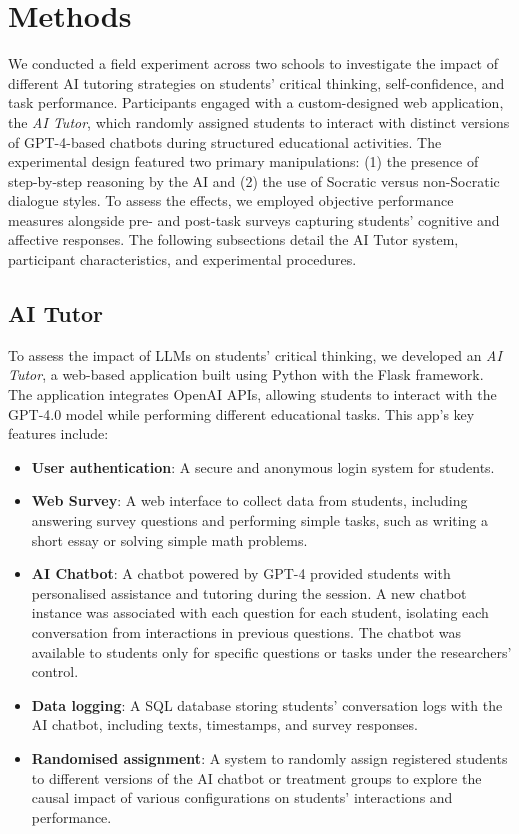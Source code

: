 \documentclass[
  12pt,
]{article}
\providecommand{\tightlist}{%
  \setlength{\itemsep}{0pt}\setlength{\parskip}{0pt}}
\begin{document}
\section{Methods}\label{sec:methods}

We conducted a field experiment across two schools to investigate the impact of different AI tutoring strategies on students' critical thinking, self-confidence, and task performance. Participants engaged with a custom-designed web application, the \emph{AI Tutor}, which randomly assigned students to interact with distinct versions of GPT-4-based chatbots during structured educational activities. The experimental design featured two primary manipulations: (1) the presence of step-by-step reasoning by the AI and (2) the use of Socratic versus non-Socratic dialogue styles. To assess the effects, we employed objective performance measures alongside pre- and post-task surveys capturing students' cognitive and affective responses. The following subsections detail the AI Tutor system, participant characteristics, and experimental procedures.

\subsection{AI Tutor}\label{ai-tutor}

To assess the impact of LLMs on students' critical thinking, we developed an \emph{AI Tutor}, a web-based application built using Python with the Flask framework. The application integrates OpenAI APIs, allowing students to interact with the GPT-4.0 model while performing different educational tasks. This app's key features include:

\begin{itemize}
\tightlist
\item
  \textbf{User authentication}: A secure and anonymous login system for students.
\item
  \textbf{Web Survey}: A web interface to collect data from students, including answering survey questions and performing simple tasks, such as writing a short essay or solving simple math problems.
\item
  \textbf{AI Chatbot}: A chatbot powered by GPT-4 provided students with personalised assistance and tutoring during the session. A new chatbot instance was associated with each question for each student, isolating each conversation from interactions in previous questions. The chatbot was available to students only for specific questions or tasks under the researchers' control.
\item
  \textbf{Data logging}: A SQL database storing students' conversation logs with the AI chatbot, including texts, timestamps, and survey responses.
\item
  \textbf{Randomised assignment}: A system to randomly assign registered students to different versions of the AI chatbot or treatment groups to explore the causal impact of various configurations on students' interactions and performance.
\end{itemize}
\end{document}
